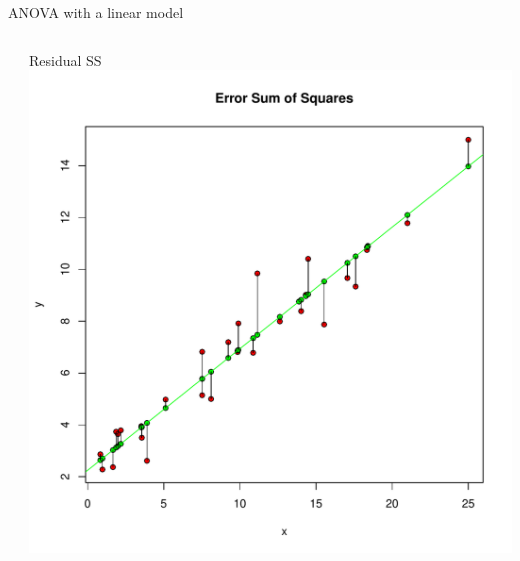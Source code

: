 \documentclass[aspectratio=169]{beamer}\usepackage[]{graphicx}\usepackage[]{color}
\makeatletter
\def\maxwidth{ %
  \ifdim\Gin@nat@width>\linewidth
    \linewidth
  \else
    \Gin@nat@width
  \fi
}
\newenvironment{knitrout}{}{} %
\makeatother
\begin{document}
\begin{frame}[fragile]{ANOVA with a linear model}
\begin{columns}
\begin{column}{0.33\textwidth}
\begin{knitrout}
\end{knitrout}
	\end{column}
	\begin{column}{0.33\textwidth}
		Residual SS
\begin{knitrout}\scriptsize
{}\color{fgcolor}
\includegraphics[width=\maxwidth]{figure/unnamed-chunk-9-1} 


\end{knitrout}
\end{column}
\end{columns}
\end{frame}
\end{document}
